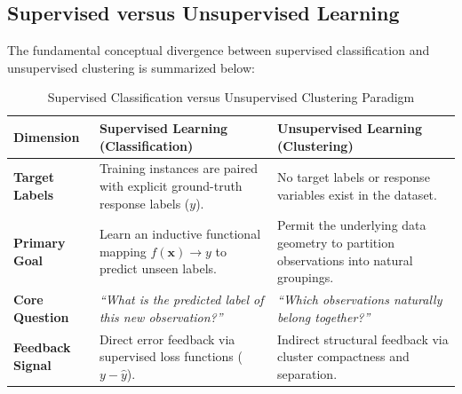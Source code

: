 \subsection{Supervised versus Unsupervised Learning}
The fundamental conceptual divergence between supervised classification and unsupervised clustering is summarized below:

\begin{table}[htbp]
\centering
\caption{Supervised Classification versus Unsupervised Clustering Paradigm}
\label{tab:supervised_vs_unsupervised}
\vspace{0.2em}
\renewcommand{\arraystretch}{1.3}
\begin{tabularx}{\textwidth}{>{\bfseries}lXX}
\toprule
Dimension & Supervised Learning (Classification) & Unsupervised Learning (Clustering) \\
\midrule
Target Labels & Training instances are paired with explicit ground-truth response labels ($y$). & No target labels or response variables exist in the dataset. \\
Primary Goal & Learn an inductive functional mapping $f(\mathbf{x}) \to y$ to predict unseen labels. & Permit the underlying data geometry to partition observations into natural groupings. \\
Core Question & \textit{``What is the predicted label of this new observation?''} & \textit{``Which observations naturally belong together?''} \\
Feedback Signal & Direct error feedback via supervised loss functions ($y - \hat{y}$). & Indirect structural feedback via cluster compactness and separation. \\
\bottomrule
\end{tabularx}
\end{table}

